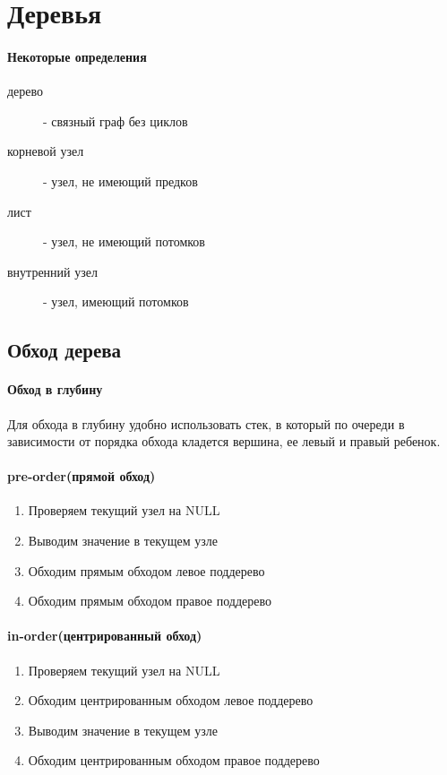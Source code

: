 \documentclass[a4paper,10pt]{article}
\begin{document}
\section{Деревья}
\paragraph{Некоторые определения}
\begin{description}
	\item[дерево] - связный граф без циклов
	\item[корневой узел] - узел, не имеющий предков
	\item[лист] - узел, не имеющий потомков
	\item[внутренний узел] - узел, имеющий потомков
\end{description}
	\subsection{Обход дерева}
\paragraph{Обход в глубину} Для обхода в глубину удобно использовать стек, в который по очереди в зависимости от порядка обхода кладется вершина, ее левый и правый ребенок. 
\paragraph{pre-order(прямой обход)}
\begin{enumerate}
	\item  Проверяем текущий узел на NULL
	\item  Выводим значение в текущем узле
	\item  Обходим прямым обходом левое поддерево
	\item  Обходим прямым обходом правое поддерево
\end{enumerate}

\paragraph{in-order(центрированный обход)}
\begin{enumerate}
	\item  Проверяем текущий узел на NULL
	\item  Обходим центрированным обходом левое поддерево
	\item  Выводим значение в текущем узле
	\item  Обходим центрированным обходом правое поддерево
\end{enumerate}
\end{document}
